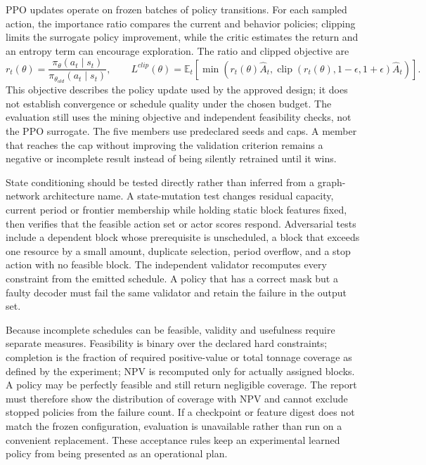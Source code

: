 PPO updates operate on frozen batches of policy transitions. For each sampled action, the importance ratio compares the current and behavior policies; clipping limits the surrogate policy improvement, while the critic estimates the return and an entropy term can encourage exploration. The ratio and clipped objective are
\begin{equation}
 r_t(\theta)=\frac{\pi_\theta(a_t\mid s_t)}{\pi_{\theta_{old}}(a_t\mid s_t)},\qquad
 L^{clip}(\theta)=\mathbb E_t\left[\min\left(r_t(\theta)\hat A_t,\operatorname{clip}(r_t(\theta),1-\epsilon,1+\epsilon)\hat A_t\right)\right].
\end{equation}
This objective describes the policy update used by the approved design; it does not establish convergence or schedule quality under the chosen budget. The evaluation still uses the mining objective and independent feasibility checks, not the PPO surrogate. The five members use predeclared seeds and caps. A member that reaches the cap without improving the validation criterion remains a negative or incomplete result instead of being silently retrained until it wins.

State conditioning should be tested directly rather than inferred from a graph-network architecture name. A state-mutation test changes residual capacity, current period or frontier membership while holding static block features fixed, then verifies that the feasible action set or actor scores respond. Adversarial tests include a dependent block whose prerequisite is unscheduled, a block that exceeds one resource by a small amount, duplicate selection, period overflow, and a stop action with no feasible block. The independent validator recomputes every constraint from the emitted schedule. A policy that has a correct mask but a faulty decoder must fail the same validator and retain the failure in the output set.

Because incomplete schedules can be feasible, validity and usefulness require separate measures. Feasibility is binary over the declared hard constraints; completion is the fraction of required positive-value or total tonnage coverage as defined by the experiment; NPV is recomputed only for actually assigned blocks. A policy may be perfectly feasible and still return negligible coverage. The report must therefore show the distribution of coverage with NPV and cannot exclude stopped policies from the failure count. If a checkpoint or feature digest does not match the frozen configuration, evaluation is unavailable rather than run on a convenient replacement. These acceptance rules keep an experimental learned policy from being presented as an operational plan.
